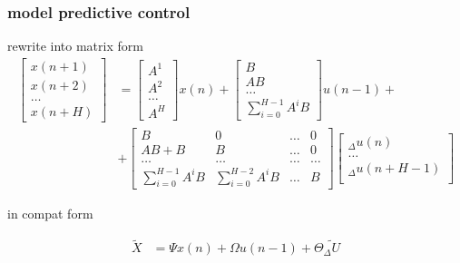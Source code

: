 \documentclass{beamer}
\begin{document}
\begin{frame}
  
  \frametitle{\bf model predictive control}
  rewrite into matrix form
  \begin{align*}
    \begin{bmatrix}
      x(n+1) \\
      x(n+2) \\
      \dots \\
      x(n+H)
    \end{bmatrix} &= 
    \begin{bmatrix}
      A^1 \\
      A^2 \\
      \dots \\
      A^H
    \end{bmatrix} x(n) +
    \begin{bmatrix}
      B \\
      AB \\
      \dots \\
      \sum_{i=0}^{H-1} A^iB
    \end{bmatrix} u(n-1) + \\
    &+
    \begin{bmatrix}
      B  & 0 & \dots & 0 \\
      AB + B & B & \dots & 0 \\
      \dots & \dots & \dots & \dots \\
      \sum_{i=0}^{H-1}A^iB & \sum_{i=0}^{H-2}A^iB & \dots & B
    \end{bmatrix}
    \begin{bmatrix}
      _\Delta u(n) \\
      \dots \\
      _\Delta u(n + H - 1) \\
    \end{bmatrix} 
  \end{align*}

  in compat form

  \begin{align*}
    \tilde{X} &= \Psi x(n) + \Omega u(n-1) + \Theta \tilde{_\Delta U}
  \end{align*}


\end{frame}
\end{document}
